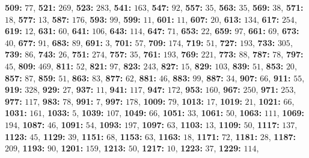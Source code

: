\textsf{\bfseries 509:} $77$, \textsf{\bfseries 521:} $269$, \textsf{\bfseries 523:} $283$, \textsf{\bfseries 541:} $163$, \textsf{\bfseries 547:} $92$, 
\textsf{\bfseries 557:} $35$, \textsf{\bfseries 563:} $35$, \textsf{\bfseries 569:} $38$, \textsf{\bfseries 571:} $18$, \textsf{\bfseries 577:} $13$, \textsf{\bfseries 587:} $176$, \textsf{\bfseries 593:} $99$, \textsf{\bfseries 599:} $11$, \textsf{\bfseries 601:} $11$, \textsf{\bfseries 607:} $20$, \textsf{\bfseries 613:} $134$, \textsf{\bfseries 617:} $254$, \textsf{\bfseries 619:} $12$, \textsf{\bfseries 631:} $60$, \textsf{\bfseries 641:} $106$, \textsf{\bfseries 643:} $114$, \textsf{\bfseries 647:} $71$, \textsf{\bfseries 653:} $22$, \textsf{\bfseries 659:} $97$, \textsf{\bfseries 661:} $69$, \textsf{\bfseries 673:} $40$, \textsf{\bfseries 677:} $91$, \textsf{\bfseries 683:} $89$, \textsf{\bfseries 691:} $3$, \textsf{\bfseries 701:} $57$, \textsf{\bfseries 709:} $174$, \textsf{\bfseries 719:} $51$, \textsf{\bfseries 727:} $193$, \textsf{\bfseries 733:} $305$, \textsf{\bfseries 739:} $86$, \textsf{\bfseries 743:} $26$, \textsf{\bfseries 751:} $274$, \textsf{\bfseries 757:} $35$, \textsf{\bfseries 761:} $193$, \textsf{\bfseries 769:} $221$, \textsf{\bfseries 773:} $88$, \textsf{\bfseries 787:} $78$, \textsf{\bfseries 797:} $45$, \textsf{\bfseries 809:} $469$, \textsf{\bfseries 811:} $52$, \textsf{\bfseries 821:} $97$, \textsf{\bfseries 823:} $243$, \textsf{\bfseries 827:} $15$, \textsf{\bfseries 829:} $103$, \textsf{\bfseries 839:} $51$, \textsf{\bfseries 853:} $20$, \textsf{\bfseries 857:} $87$, \textsf{\bfseries 859:} $51$, \textsf{\bfseries 863:} $83$, \textsf{\bfseries 877:} $62$, \textsf{\bfseries 881:} $46$, \textsf{\bfseries 883:} $99$, \textsf{\bfseries 887:} $34$, \textsf{\bfseries 907:} $66$, \textsf{\bfseries 911:} $55$, \textsf{\bfseries 919:} $328$, \textsf{\bfseries 929:} $27$, \textsf{\bfseries 937:} $11$, \textsf{\bfseries 941:} $117$, \textsf{\bfseries 947:} $172$, \textsf{\bfseries 953:} $160$, \textsf{\bfseries 967:} $250$, \textsf{\bfseries 971:} $253$, \textsf{\bfseries 977:} $117$, \textsf{\bfseries 983:} $78$, \textsf{\bfseries 991:} $7$, \textsf{\bfseries 997:} $178$, \textsf{\bfseries 1009:} $79$, \textsf{\bfseries 1013:} $17$, \textsf{\bfseries 1019:} $21$, \textsf{\bfseries 1021:} $66$, \textsf{\bfseries 1031:} $161$, \textsf{\bfseries 1033:} $5$, \textsf{\bfseries 1039:} $107$, \textsf{\bfseries 1049:} $66$, \textsf{\bfseries 1051:} $33$, \textsf{\bfseries 1061:} $50$, \textsf{\bfseries 1063:} $111$, \textsf{\bfseries 1069:} $194$, \textsf{\bfseries 1087:} $46$, \textsf{\bfseries 1091:} $54$, \textsf{\bfseries 1093:} $197$, \textsf{\bfseries 1097:} $63$, \textsf{\bfseries 1103:} $13$, \textsf{\bfseries 1109:} $50$, \textsf{\bfseries 1117:} $137$, \textsf{\bfseries 1123:} $45$, \textsf{\bfseries 1129:} $39$, \textsf{\bfseries 1151:} $68$, \textsf{\bfseries 1153:} $63$, \textsf{\bfseries 1163:} $18$, \textsf{\bfseries 1171:} $72$, \textsf{\bfseries 1181:} $28$, \textsf{\bfseries 1187:} $209$, \textsf{\bfseries 1193:} $90$, \textsf{\bfseries 1201:} $159$, \textsf{\bfseries 1213:} $50$, \textsf{\bfseries 1217:} $10$, \textsf{\bfseries 1223:} $37$, \textsf{\bfseries 1229:} $114$, 
